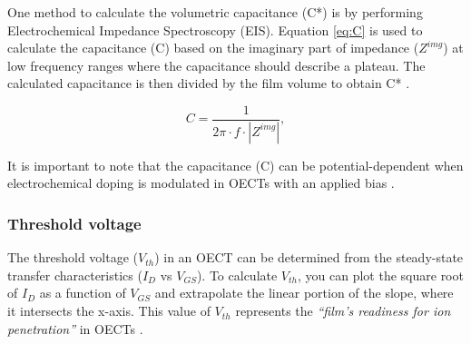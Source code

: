 One method to calculate the volumetric capacitance (C*) is by performing Electrochemical Impedance Spectroscopy (EIS). Equation \ref{eq:C} is used to calculate the capacitance (C) based on the imaginary part of impedance ($Z^{img}$) at low frequency ranges where the capacitance should describe a plateau. %
The calculated capacitance is then divided by the film volume to obtain C* %
 \cite{ohayonGuideCharacterizationOrganic2023}.

\begin{equation} \label{eq:C}
	C = \frac{1}{2\pi \cdot f \cdot |Z^{img}|},
\end{equation}

It is important to note that the capacitance (C) can be potential-dependent when electrochemical doping is modulated in OECTs with an applied bias %
\cite{inalBenchmarkingOrganicMixed2017}.

\subsubsection{Threshold voltage}

The threshold voltage ($V_{th}$) in an OECT can be determined from the steady-state transfer characteristics ($I_{D}$ vs $V_{GS}$). To calculate $V_{th}$, you can plot the square root of $I_{D}$ as a function of $V_{GS}$ and extrapolate the linear portion of the slope, where it intersects the x-axis. This value of $V_{th}$ represents the \textit{``film's readiness for ion penetration''} in OECTs \cite{ohayonGuideCharacterizationOrganic2023}.

